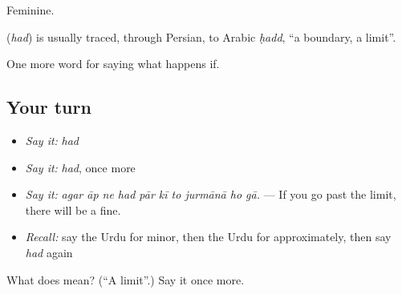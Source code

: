 Feminine.

\begin{cousinweb}
\textbf{} (\emph{had}) is usually traced, through Persian, to Arabic \emph{ḥadd}, \textquotedblleft{}a boundary, a limit\textquotedblright{}.
\end{cousinweb}

\begin{grammarlens}[title={What you've built}]
One more word for saying what happens if.
\end{grammarlens}

\subsection*{Your turn}
\begin{itemize}
\raggedright
  \item \emph{Say it:} \emph{had}
  \item \emph{Say it:} \emph{had}, once more
  \item \emph{Say it:} \emph{agar āp ne had pār kī to jurmānā ho gā.} — If you go past the limit, there will be a fine.
  \item \emph{Recall:} say the Urdu for minor, then the Urdu for approximately, then say \emph{had} again
\end{itemize}

\begin{tcolorbox}[breakable,colback=teal!4,colframe=teal!35!black,title={Before you move on}]
What does  mean? (\textquotedblleft{}A limit\textquotedblright{}.) Say it once more.
\end{tcolorbox}
